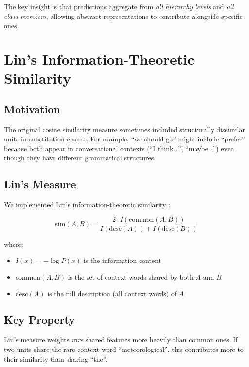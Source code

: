 \documentclass[11pt,a4paper]{article}
\begin{document}
The key insight is that predictions aggregate from \emph{all hierarchy levels} and \emph{all class members}, allowing abstract representations to contribute alongside specific ones.

\section{Lin's Information-Theoretic Similarity}

\subsection{Motivation}

The original cosine similarity measure sometimes included structurally dissimilar units in substitution classes. For example, ``we should go'' might include ``prefer'' because both appear in conversational contexts (``I think...'', ``maybe...'') even though they have different grammatical structures.

\subsection{Lin's Measure}

We implemented Lin's information-theoretic similarity \cite{lin1998information}:

\begin{equation}
    \text{sim}(A, B) = \frac{2 \cdot I(\text{common}(A, B))}{I(\text{desc}(A)) + I(\text{desc}(B))}
\end{equation}

where:
\begin{itemize}
    \item $I(x) = -\log P(x)$ is the information content
    \item $\text{common}(A, B)$ is the set of context words shared by both $A$ and $B$
    \item $\text{desc}(A)$ is the full description (all context words) of $A$
\end{itemize}

\subsection{Key Property}

Lin's measure weights \emph{rare} shared features more heavily than common ones. If two units share the rare context word ``meteorological'', this contributes more to their similarity than sharing ``the''.
\end{document}
